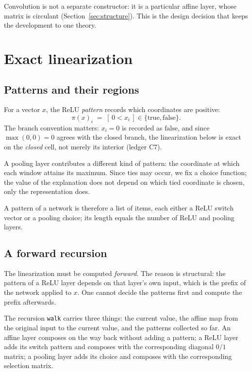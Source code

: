 \documentclass[11pt]{article}
\newcommand{\code}[1]{\texttt{#1}}
\begin{document}
Convolution is not a separate constructor: it is a particular affine layer,
whose matrix is circulant (Section~\ref{sec:structure}). This is the design
decision that keeps the development to one theory.

\section{Exact linearization}

\subsection{Patterns and their regions}

For a vector $x$, the ReLU \emph{pattern} records which coordinates are
positive:
\[
  \pi(x)_i \;=\; [\,0 < x_i\,] \in \{\mathrm{true}, \mathrm{false}\}.
\]
The branch convention matters: $x_i = 0$ is recorded as $\mathrm{false}$, and
since $\max(0,0) = 0$ agrees with the closed branch, the linearization below is
exact on the \emph{closed} cell, not merely its interior (ledger C7).

A pooling layer contributes a different kind of pattern: the coordinate at
which each window attains its maximum. Since ties may occur, we fix a choice
function; the value of the explanation does not depend on which tied coordinate
is chosen, only the representation does.

A pattern of a network is therefore a list of items, each either a ReLU switch
vector or a pooling choice; its length equals the number of ReLU and pooling
layers.

\subsection{A forward recursion}

The linearization must be computed \emph{forward}. The reason is structural:
the pattern of a ReLU layer depends on that layer's own input, which is the
prefix of the network applied to $x$. One cannot decide the patterns first and
compute the prefix afterwards.

The recursion \code{walk} carries three things: the current value, the affine
map from the original input to the current value, and the patterns collected so
far. An affine layer composes on the way back without adding a pattern; a ReLU
layer adds its switch pattern and composes with the corresponding diagonal
$0/1$ matrix; a pooling layer adds its choice and composes with the
corresponding selection matrix.
\end{document}
